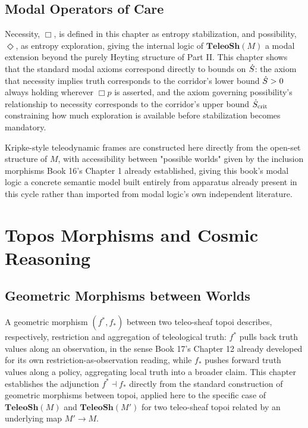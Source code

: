 \chapter{Modal Operators of Care}

Necessity, $\Box$, is defined in this chapter as entropy stabilization, and possibility, $\Diamond$, as entropy exploration, giving the internal logic of $\mathbf{TeleoSh}(M)$ a modal extension beyond the purely Heyting structure of Part II. This chapter shows that the standard modal axioms correspond directly to bounds on $\dot{S}$: the axiom that necessity implies truth corresponds to the corridor's lower bound $\dot{S} > 0$ always holding wherever $\Box p$ is asserted, and the axiom governing possibility's relationship to necessity corresponds to the corridor's upper bound $\dot{S}_{\text{crit}}$ constraining how much exploration is available before stabilization becomes mandatory.

Kripke-style teleodynamic frames are constructed here directly from the open-set structure of $M$, with accessibility between "possible worlds" given by the inclusion morphisms Book 16's Chapter 1 already established, giving this book's modal logic a concrete semantic model built entirely from apparatus already present in this cycle rather than imported from modal logic's own independent literature.

\part{Topos Morphisms and Cosmic Reasoning}

\chapter{Geometric Morphisms between Worlds}

A geometric morphism $(f^{*}, f_{*})$ between two teleo-sheaf topoi describes, respectively, restriction and aggregation of teleological truth: $f^{*}$ pulls back truth values along an observation, in the sense Book 17's Chapter 12 already developed for its own restriction-as-observation reading, while $f_{*}$ pushes forward truth values along a policy, aggregating local truth into a broader claim. This chapter establishes the adjunction $f^{*} \dashv f_{*}$ directly from the standard construction of geometric morphisms between topoi, applied here to the specific case of $\mathbf{TeleoSh}(M)$ and $\mathbf{TeleoSh}(M')$ for two teleo-sheaf topoi related by an underlying map $M' \to M$.


